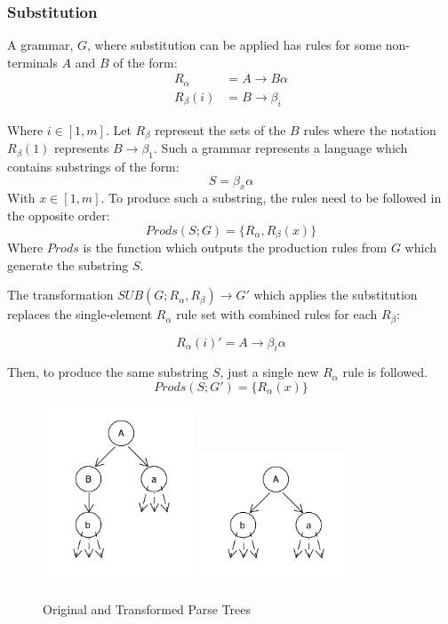 \documentclass[11pt]{article}
\begin{document}
{\subsubsection{Substitution}

A grammar, $G$, where substitution can be applied has rules for some non-terminals $A$ and $B$ of the form:
\begin{align*}
R_\alpha &= A \rightarrow B \alpha\\
R_\beta(i) &= B \rightarrow \beta_i
\end{align*}

Where $i \in [1,m]$. Let $R_\beta$ represent the sets of the $B$ rules where the notation
$R_\beta(1)$ represents $B \rightarrow \beta_1$. 
Such a grammar represents a language which contains substrings of the form:
\[ S = \beta_x \alpha\] 
With $x \in [1,m]$.
To produce such a substring, the rules need to be followed in the opposite order:
\[Prods(S;G) = \{R_\alpha, R_\beta(x)\}\]
Where $Prods$ is the function which outputs the production rules from $G$ which generate the substring $S$.

The transformation \cite{aho} $SUB(G; R_\alpha, R_\beta) \rightarrow G'$ which applies the substitution
replaces the single-element $R_\alpha$ rule set with combined rules for each $R_\beta$:

\[ R_\alpha(i)' = A \rightarrow \beta_i \alpha \]

Then, to produce the same substring $S$, just a single new $R_\alpha$ rule is followed. 
\[Prods(S;G') = \{R_\alpha(x)\}\]

\begin{figure}[h!]
    \centering
    \includegraphics[width=0.4\textwidth,natwidth=1,natheight=1]{umlet/sub_orig.pdf}
    \includegraphics[width=0.4\textwidth,natwidth=1,natheight=1]{umlet/sub_comp.pdf}
    \caption{Original and Transformed Parse Trees}
    \label{fig:dlre}
\end{figure}

}
\end{document}
